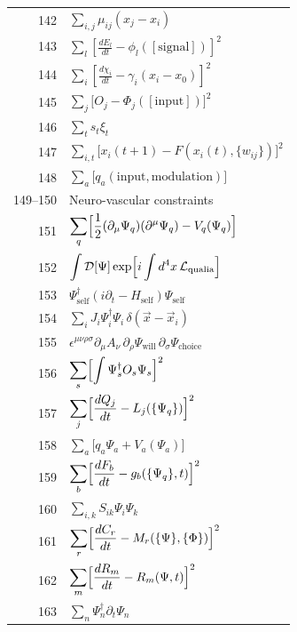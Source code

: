 \documentclass[11pt,a4paper]{article}
\begin{document}
\begin{longtable}{r p{}}
	142 & \(\displaystyle \sum_{i,j}\mu_{ij}(x_j - x_i)\) \\
	143 & \(\displaystyle \sum_l\left[\frac{dE_l}{dt} - \phi_l([\text{signal}])\right]^2\) \\
	144 & \(\displaystyle \sum_i\left[\frac{d\chi_i}{dt} - \gamma_i(x_i - x_0)\right]^2\) \\
	145 & \(\displaystyle \sum_j\bigl[O_j - \Phi_j([\text{input}])\bigr]^2\) \\
	146 & \(\displaystyle \sum_t s_t\xi_t\) \\
	147 & \(\displaystyle \sum_{i,t}\bigl[x_i(t+1) - F(x_i(t),\{w_{ij}\})\bigr]^2\) \\
	148 & \(\displaystyle \sum_a\bigl[q_a(\text{input},\text{modulation})\bigr]\) \\
	149–150 & Neuro-vascular constraints \\
	151 & \(\displaystyle \sum_q\Bigl[\frac12(\partial_\mu\Psi_q)(\partial^\mu\Psi_q) - V_q(\Psi_q)\Bigr]\) \\
	152 & \(\displaystyle \int\mathcal{D}[\Psi]\exp\Bigl[i\int d^4x\,\mathcal{L}_{\text{qualia}}\Bigr]\) \\
	153 & \(\displaystyle \Psi^\dagger_{\text{self}}(i\partial_t - H_{\text{self}})\Psi_{\text{self}}\) \\
	154 & \(\displaystyle \sum_i J_i\Psi^\dagger_i\Psi_i\,\delta(\vec x - \vec x_i)\) \\
	155 & \(\displaystyle \epsilon^{\mu\nu\rho\sigma}\partial_\mu A_\nu\,\partial_\rho\Psi_{\text{will}}\,\partial_\sigma\Psi_{\text{choice}}\) \\
	156 & \(\displaystyle \sum_s\Bigl[\int\Psi^\dagger_s O_s\Psi_s\Bigr]^2\) \\
	157 & \(\displaystyle \sum_j\Bigl[\frac{dQ_j}{dt} - L_j(\{\Psi_q\})\Bigr]^2\) \\
	158 & \(\displaystyle \sum_a\bigl[q_a\Psi_a + V_a(\Psi_a)\bigr]\) \\
	159 & \(\displaystyle \sum_b\Bigl[\frac{dF_b}{dt} - g_b(\{\Psi_q\},t)\Bigr]^2\) \\
	160 & \(\displaystyle \sum_{i,k}S_{ik}\Psi_i\Psi_k\) \\
	161 & \(\displaystyle \sum_r\Bigl[\frac{dC_r}{dt} - M_r(\{\Psi\},\{\Phi\})\Bigr]^2\) \\
	162 & \(\displaystyle \sum_m\Bigl[\frac{dR_m}{dt} - R_m(\Psi,t)\Bigr]^2\) \\
	163 & \(\displaystyle \sum_n\Psi^\dagger_n\partial_t\Psi_n\) \\

\end{longtable}
\end{document}
